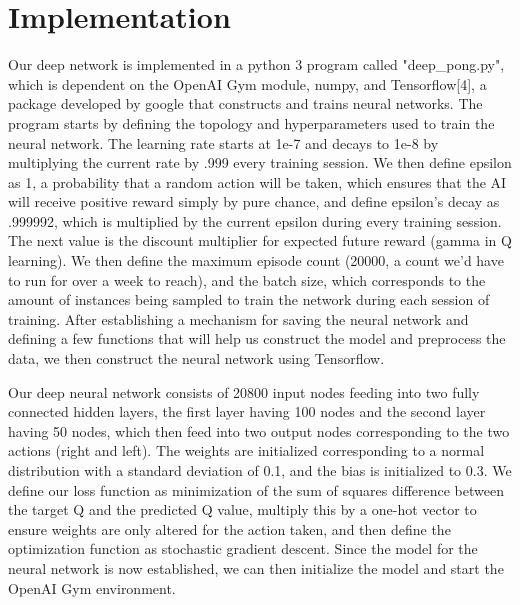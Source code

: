 \documentclass[12pt]{article}
\theoremstyle{plain}
\theoremstyle{definition}
\theoremstyle{remark}
\theoremstyle{plain}
\begin{document}
\section{Implementation}
\par
Our deep network is implemented in a python 3 program called "deep\_pong.py", which is dependent on the OpenAI Gym module, numpy, and Tensorflow[4], a package developed by google that constructs and trains neural networks.  The program starts by defining the topology and hyperparameters used to train the neural network.  The learning rate starts at 1e-7 and decays to 1e-8 by multiplying the current rate by .999 every training session.  We then define epsilon as 1, a probability that a random action will be taken, which ensures that the AI will receive positive reward simply by pure chance, and define epsilon's decay as .999992, which is multiplied by the current epsilon during every training session.  The next value is the discount multiplier for expected future reward (gamma in Q learning).  We then define the maximum episode count (20000, a count we'd have to run for over a week to reach), and the batch size, which corresponds to the amount of instances being sampled to train the network during each session of training.  After establishing a mechanism for saving the neural network and defining a few functions that will help us construct the model and preprocess the data, we then construct the neural network using Tensorflow.
\par
Our deep neural network consists of 20800 input nodes feeding into two fully connected hidden layers, the first layer having 100 nodes and the second layer having 50 nodes, which then feed into two output nodes corresponding to the two actions (right and left).  The weights are initialized corresponding to a normal distribution with a standard deviation of 0.1, and the bias is initialized to 0.3.  We define our loss function as minimization of the sum of squares difference between the target Q and the predicted Q value, multiply this by a one-hot vector to ensure weights are only altered for the action taken, and then define the optimization function as stochastic gradient descent.  Since the model for the neural network is now established, we can then initialize the model and start the OpenAI Gym environment.
\par
\end{document}
